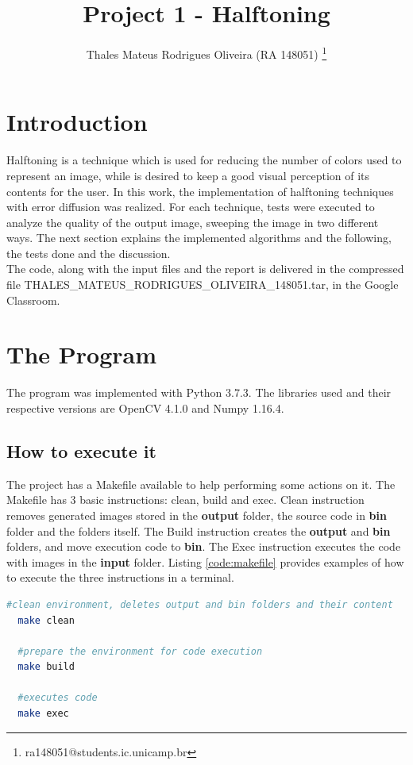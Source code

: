 \documentclass[]{IEEEtran}
\begin{document}
  \title{Project 1 - Halftoning}
  \author{Thales Mateus Rodrigues Oliveira (RA 148051)
    \thanks{ra148051@students.ic.unicamp.br}
  }
  \maketitle
  
  \begin{abstract}

  \end{abstract}
  
\section{Introduction}
Halftoning is a technique which is used for reducing the number of colors used to represent an image, while is desired to keep a good visual perception of its contents for the user. In this work, the implementation of halftoning techniques with error diffusion was realized. For each technique, tests were executed to analyze the quality of the output image, sweeping the image in two different ways. The next section explains the implemented algorithms and the following, the tests done and the discussion.
\\
The code, along with the input files and the report is delivered in the compressed file THALES\_MATEUS\_RODRIGUES\_OLIVEIRA\_148051.tar, in the Google Classroom.
\section{The Program}
 
The program was implemented with Python 3.7.3. The libraries used and their respective versions are OpenCV 4.1.0 and Numpy 1.16.4.

\subsection{How to execute it}

The project has a Makefile available to help performing some actions on it. The Makefile has 3 basic instructions: clean, build and exec. Clean instruction removes generated images stored in the \textbf{output} folder, the source code in \textbf{bin} folder and the folders itself. The Build instruction creates the \textbf{output} and \textbf{bin} folders, and move execution code to \textbf{bin}. The Exec instruction executes the code with images in the \textbf{input} folder. Listing \ref{code:makefile} provides examples of how to execute the three instructions in a terminal.
\begin{lstlisting}[language=sh, caption={Makefile usage example}, label={code:makefile}]
  #clean environment, deletes output and bin folders and their content
  make clean
  
  #prepare the environment for code execution
  make build 

  #executes code
  make exec
\end{lstlisting}
\end{document}
